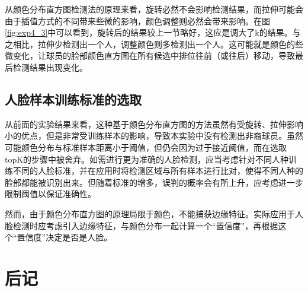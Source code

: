 \documentclass[10pt, a4paper]{article}
\begin{document}
从颜色分布直方图检测法的原理来看，旋转必然不会影响检测结果，而拉伸可能会由于插值方式的不同带来些微的影响，颜色调整则必然会带来影响。在图\ref{fig:exp4_3}中可以看到，旋转后的结果较上一节略好，这应是调大了k的结果。与之相比，拉伸少检测出一个人，调整颜色则多检测出一个人。这可能就是颜色的些微变化，让球员的脸部颜色直方图在所有候选中排位往前（或往后）移动，导致最后检测结果出现变化。

\subsection{人脸样本训练标准的选取}

从前面的实验结果来看，这种基于颜色分布直方图的方法虽然有受旋转、拉伸影响小的优点，但是非常受训练样本的影响，导致本实验中没有检测出非裔球员。虽然可能颜色分布与标准样本距离小于阈值，但仍会因为过于接近阈值，而在选取topK的步骤中被舍弃。如需进行更为准确的人脸检测，应当考虑针对不同人种训练不同的人脸标准，并在应用时将检测区域与所有样本进行比对，使得不同人种的脸部都能被识别出来。但随着标准的增多，误判的概率会有所上升，应考虑进一步限制阈值以保证准确性。

然而，由于颜色分布直方图的原理局限于颜色，不能捕获边缘特征。实际应用于人脸检测时应考虑引入边缘特征，与颜色分布一起计算一个“置信度”，再根据这个“置信度”决定是否是人脸。

\section{后记}
\end{document}
